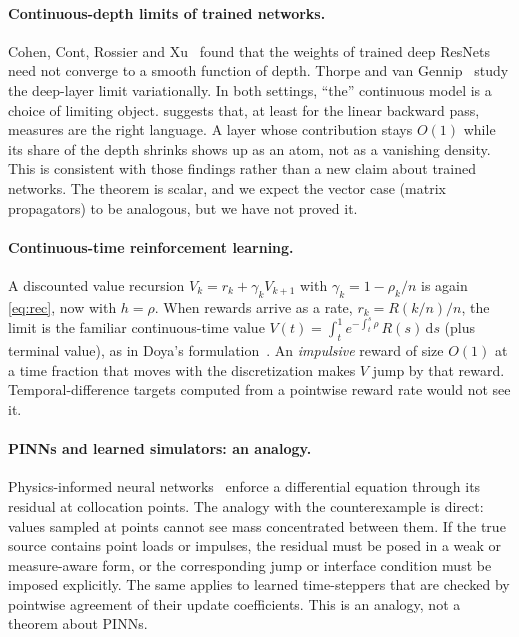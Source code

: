 \documentclass[11pt]{article}
\theoremstyle{plain}
\theoremstyle{remark}
\newcommand{\dd}{\mathrm{d}}
\begin{document}
\paragraph{Continuous-depth limits of trained networks.}
Cohen, Cont, Rossier and Xu~\cite{cohen} found that the weights of trained deep ResNets
need not converge to a smooth function of depth. Thorpe and van Gennip~\cite{thorpe} study
the deep-layer limit variationally. In both settings, ``the'' continuous model is a choice
of limiting object.  suggests that, at least for the linear backward pass,
measures are the right language. A layer whose contribution stays $O(1)$ while its share of
the depth shrinks shows up as an atom, not as a vanishing density. This is consistent with
those findings rather than a new claim about trained networks. The theorem is scalar, and
we expect the vector case (matrix propagators) to be analogous, but we have not proved it.

\paragraph{Continuous-time reinforcement learning.}
A discounted value recursion $V_k=r_k+\gamma_kV_{k+1}$ with $\gamma_k=1-\rho_k/n$ is again
\eqref{eq:rec}, now with $h=\rho$. When rewards arrive as a rate, $r_k=R(k/n)/n$, the limit
is the familiar continuous-time value
$V(t)=\int_t^{1}e^{-\int_t^s\rho}\,R(s)\,\dd s$ (plus terminal value), as in
Doya's formulation~\cite{doya}. An \emph{impulsive} reward of size $O(1)$ at a time
fraction that moves with the discretization makes $V$ jump by that reward. Temporal-difference
targets computed from a pointwise reward rate would not see it.

\paragraph{PINNs and learned simulators: an analogy.}
Physics-informed neural networks~\cite{raissi} enforce a differential equation through its
residual at collocation points. The analogy with the counterexample is direct: values
sampled at points cannot see mass concentrated between them. If the true source contains
point loads or impulses, the residual must be posed in a weak or measure-aware form, or the
corresponding jump or interface condition must be imposed explicitly. The same applies to
learned time-steppers that are checked by pointwise agreement of their update
coefficients. This is an analogy, not a theorem about PINNs.
\end{document}
